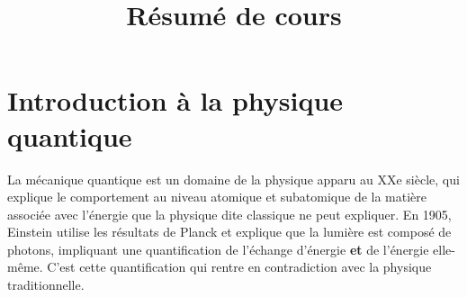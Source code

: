 \documentclass{article}
\author{}
\date{}
\title{Résumé de cours}
\begin{document}
\maketitle
\section{Introduction à la physique quantique}
La mécanique quantique est un domaine de la physique apparu au XXe siècle, qui explique le comportement au niveau atomique et subatomique de la matière associée avec l'énergie que la physique dite classique ne peut expliquer.\newline
\indent En 1905, Einstein utilise les résultats de Planck et explique que la lumière est composé de photons, impliquant une quantification de l'échange d'énergie \textbf{et} de l'énergie elle-même. C'est cette quantification qui rentre en contradiction avec la physique traditionnelle.\newline\newline
\end{document}
